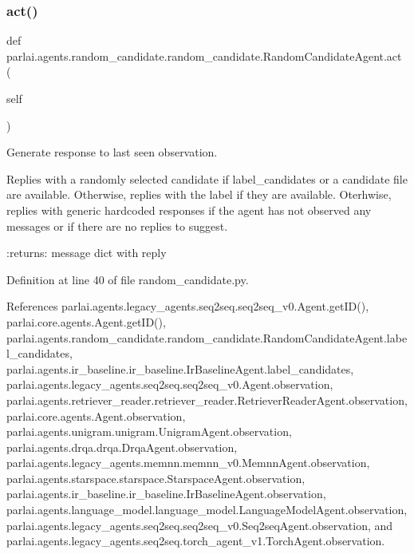 \subsubsection{\texorpdfstring{act()}{act()}}
{\footnotesize\ttfamily def parlai.\+agents.\+random\+\_\+candidate.\+random\+\_\+candidate.\+Random\+Candidate\+Agent.\+act (\begin{DoxyParamCaption}\item[{}]{self }\end{DoxyParamCaption})}

\begin{DoxyVerb}Generate response to last seen observation.

Replies with a randomly selected candidate if label_candidates or a
candidate file are available.
Otherwise, replies with the label if they are available.
Oterhwise, replies with generic hardcoded responses if the agent has
not observed any messages or if there are no replies to suggest.

:returns: message dict with reply
\end{DoxyVerb}
 

Definition at line 40 of file random\+\_\+candidate.\+py.



References parlai.\+agents.\+legacy\+\_\+agents.\+seq2seq.\+seq2seq\+\_\+v0.\+Agent.\+get\+I\+D(), parlai.\+core.\+agents.\+Agent.\+get\+I\+D(), parlai.\+agents.\+random\+\_\+candidate.\+random\+\_\+candidate.\+Random\+Candidate\+Agent.\+label\+\_\+candidates, parlai.\+agents.\+ir\+\_\+baseline.\+ir\+\_\+baseline.\+Ir\+Baseline\+Agent.\+label\+\_\+candidates, parlai.\+agents.\+legacy\+\_\+agents.\+seq2seq.\+seq2seq\+\_\+v0.\+Agent.\+observation, parlai.\+agents.\+retriever\+\_\+reader.\+retriever\+\_\+reader.\+Retriever\+Reader\+Agent.\+observation, parlai.\+core.\+agents.\+Agent.\+observation, parlai.\+agents.\+unigram.\+unigram.\+Unigram\+Agent.\+observation, parlai.\+agents.\+drqa.\+drqa.\+Drqa\+Agent.\+observation, parlai.\+agents.\+legacy\+\_\+agents.\+memnn.\+memnn\+\_\+v0.\+Memnn\+Agent.\+observation, parlai.\+agents.\+starspace.\+starspace.\+Starspace\+Agent.\+observation, parlai.\+agents.\+ir\+\_\+baseline.\+ir\+\_\+baseline.\+Ir\+Baseline\+Agent.\+observation, parlai.\+agents.\+language\+\_\+model.\+language\+\_\+model.\+Language\+Model\+Agent.\+observation, parlai.\+agents.\+legacy\+\_\+agents.\+seq2seq.\+seq2seq\+\_\+v0.\+Seq2seq\+Agent.\+observation, and parlai.\+agents.\+legacy\+\_\+agents.\+seq2seq.\+torch\+\_\+agent\+\_\+v1.\+Torch\+Agent.\+observation.



